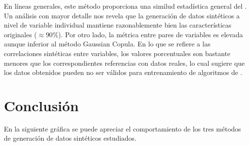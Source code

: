 \documentclass[a4paper,10pt,spanish]{jupyterBook}
\begin{document}
En líneas generales, este método proporciona una similud estadística general del . Un análisis con mayor detalle nos revela que la generación de datos sintéticos a nivel de variable individual mantiene razonablemente bien las características originales (\(\approx 90\%\)). Por otro lado, la métrica  entre pares de variables es elevada aunque inferior al método Gaussian Copula. En lo que se refiere a las correlaciones sintéticas entre variables, los valores porcentuales son bastante menores que los correspondientes referencias con datos reales, lo cual sugiere que los datos obtenidos pueden no ser válidos para entrenamiento de algoritmos de .

\sphinxstepscope


\section{Conclusión}
\label{\detokenize{content/02/Conclusion:conclusion}}\label{\detokenize{content/02/Conclusion::doc}}
\sphinxAtStartPar
En la siguiente gráfica se puede apreciar el comportamiento de los tres métodos de generación de datos sintéticos estudiados.
\end{document}
